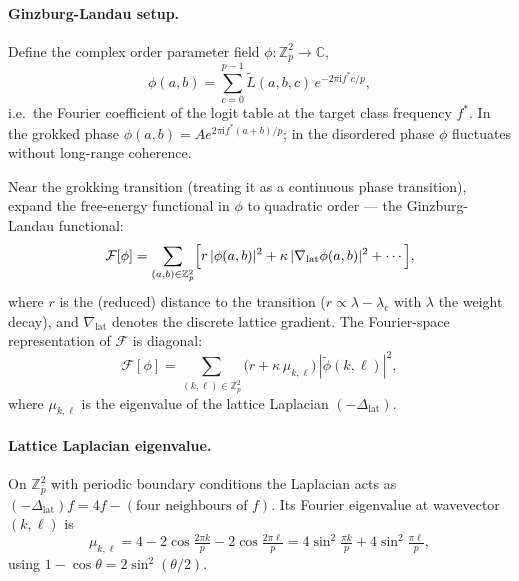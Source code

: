 \documentclass[11pt]{article}
\newcommand{\Zp}{\mathbb{Z}_p}
\newcommand{\C}{\mathbb{C}}
\newcommand{\ii}{\mathrm{i}}
\begin{document}
\paragraph{Ginzburg-Landau setup.}
Define the complex order parameter field
$\phi: \Zp^2 \to \C$,
\begin{equation}
    \phi(a,b) = \sum_{c=0}^{p-1} \tilde{L}(a,b,c)\,e^{-2\pi\ii f^* c/p},
\end{equation}
i.e.\ the Fourier coefficient of the logit table at the target class
frequency $f^*$.
In the grokked phase $\phi(a,b) = A e^{2\pi\ii f^*(a+b)/p}$; in the
disordered phase $\phi$ fluctuates without long-range coherence.

Near the grokking transition (treating it as a continuous phase transition),
expand the free-energy functional in $\phi$ to quadratic order --- the
Ginzburg-Landau functional:
\begin{equation}
    \mathcal{F}[\phi]
    = \sum_{(a,b)\in\Zp^2}
    \Bigl[r\,|\phi(a,b)|^2
         + \kappa\,|\nabla_{\mathrm{lat}}\phi(a,b)|^2
         + \cdots\Bigr],
    \label{eq:GL}
\end{equation}
where $r$ is the (reduced) distance to the transition ($r\propto
\lambda - \lambda_c$ with $\lambda$ the weight decay), and
$\nabla_{\mathrm{lat}}$ denotes the discrete lattice gradient.
The Fourier-space representation of $\mathcal{F}$ is diagonal:
\begin{equation}
    \mathcal{F}[\phi]
    = \sum_{(k,\ell)\in\Zp^2}
    \bigl(r + \kappa\,\mu_{k,\ell}\bigr)\,|\tilde\phi(k,\ell)|^2,
\end{equation}
where $\mu_{k,\ell}$ is the eigenvalue of the lattice Laplacian
$(-\Delta_{\mathrm{lat}})$.

\paragraph{Lattice Laplacian eigenvalue.}
On $\Zp^2$ with periodic boundary conditions the Laplacian acts as
$(-\Delta_{\mathrm{lat}})f = 4f - (\text{four neighbours of }f)$.
Its Fourier eigenvalue at wavevector $(k,\ell)$ is
\begin{equation}
    \mu_{k,\ell}
    = 4 - 2\cos\!\tfrac{2\pi k}{p} - 2\cos\!\tfrac{2\pi\ell}{p}
    = 4\sin^2\!\tfrac{\pi k}{p} + 4\sin^2\!\tfrac{\pi\ell}{p},
    \label{eq:dispersion}
\end{equation}
using $1-\cos\theta = 2\sin^2(\theta/2)$.
\end{document}
